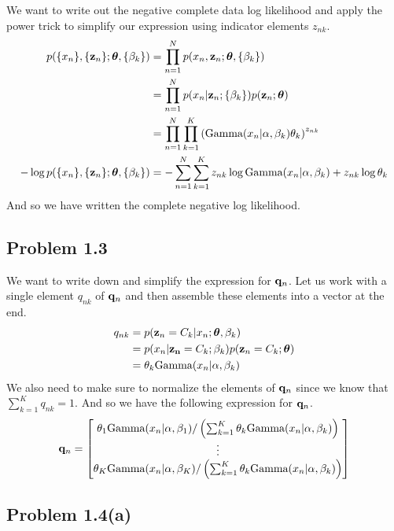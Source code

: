 \documentclass[submit]{harvardml}
\begin{document}
We want to write out the negative complete data log likelihood and apply the power trick to simplify our expression using indicator elements $z_{n k}$.
\begin{align*}
    p(\{x_n\}, \{ \vb{z}_n \} ; \boldsymbol{\theta}, \{ \beta_k \}) &= \prod_{n=1}^N p(x_n, \vb{z}_n ; \boldsymbol{\theta}, \{ \beta_k \}) \\
    &= \prod_{n=1}^N p(x_n | \vb{z}_n; \{ \beta_k \}) p(\vb{z}_n ; \boldsymbol{\theta})\\
    &= \prod_{n=1}^N \prod_{k=1}^K \left(\text{Gamma}(x_n | \alpha, \beta_k) \theta_k \right)^{z_{n k}}\\
    -\log p(\{x_n\}, \{ \vb{z}_n \} ; \boldsymbol{\theta}, \{ \beta_k \}) &= -\sum_{n=1}^N \sum_{k=1}^K z_{n k} \log \text{Gamma}(x_n | \alpha, \beta_k) + z_{n k} \log \theta_k
\end{align*}
And so we have written the complete negative log likelihood.

\subsection*{Problem 1.3}

We want to write down and simplify the expression for $\vb{q}_n$. Let us work with a single element $q_{n k}$ of $\vb{q}_n$ and then assemble these elements into a vector at the end.
\begin{align*}
    q_{n k} &= p(\vb{z}_n = C_k | x_n ; \boldsymbol{\theta}, \beta_k) \\
    &= p(x_n | \vb{z_n} = C_k ; \beta_k) p(\vb{z}_n = C_k ; \boldsymbol{\theta}) \\
    &= \theta_k \text{Gamma}(x_n | \alpha, \beta_k)
\end{align*}
We also need to make sure to normalize the elements of $\vb{q}_n$ since we know that $\sum_{k=1}^K q_{n k} = 1$. And so we have the following expression for $\vb{q}_n$.
\begin{equation*}
    \vb{q}_n = \begin{bmatrix}
        \theta_1 \text{Gamma}(x_n | \alpha, \beta_1) / \left(\sum_{k=1}^K \theta_k \text{Gamma}(x_n | \alpha, \beta_k)\right) \\
        \vdots \\
        \theta_K \text{Gamma}(x_n | \alpha, \beta_K) / \left(\sum_{k=1}^K \theta_k \text{Gamma}(x_n | \alpha, \beta_k)\right)
    \end{bmatrix}
\end{equation*}

\subsection*{Problem 1.4(a)}
\end{document}

